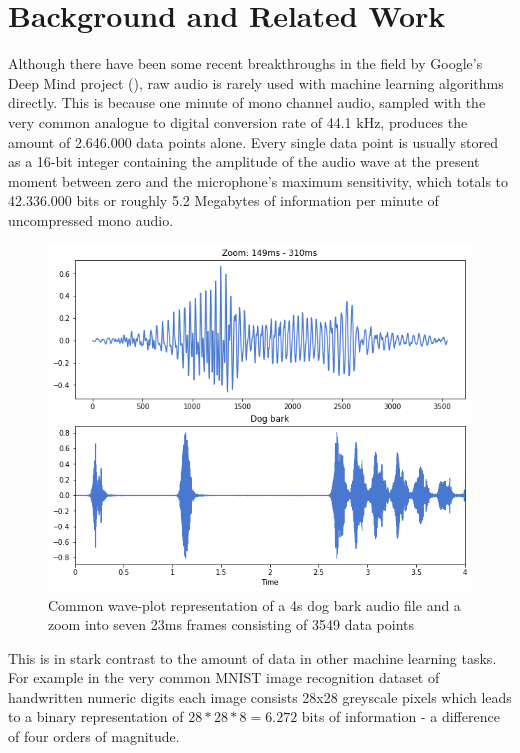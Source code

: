 


\chapter{Background and Related Work}
\label{Background and Related Work}

Although there have been some recent breakthroughs in the field by Google's Deep Mind project (\cite{DBLP:journals/corr/OordDZSVGKSK16}), raw audio is rarely used with machine learning algorithms directly. This is because one minute of mono channel audio, sampled with the very common analogue to digital conversion rate of 44.1 kHz, produces the amount of 2.646.000 data points alone. Every single data point is usually stored as a 16-bit integer containing the amplitude of the audio wave at the present moment between zero and the microphone's maximum sensitivity, which totals to 42.336.000 bits or roughly 5.2 Megabytes of information per minute of uncompressed mono audio.


\begin{figure}[h]
    \centering
	\includegraphics[width=.6\textwidth]{./images/illustrations/audio-signal}
    \caption{Common wave-plot representation of a 4s dog bark audio file and a zoom into seven 23ms frames consisting of 3549 data points}
    \label{fig:audio}
\end{figure}


This is in stark contrast to the amount of data in other machine learning tasks. For example in the very common MNIST image recognition dataset of handwritten numeric digits each image consists 28x28 greyscale pixels which leads to a binary representation of $28*28*8 = 6.272$ bits of information \cite{lecun1998mnist} - a difference of four orders of magnitude.  


